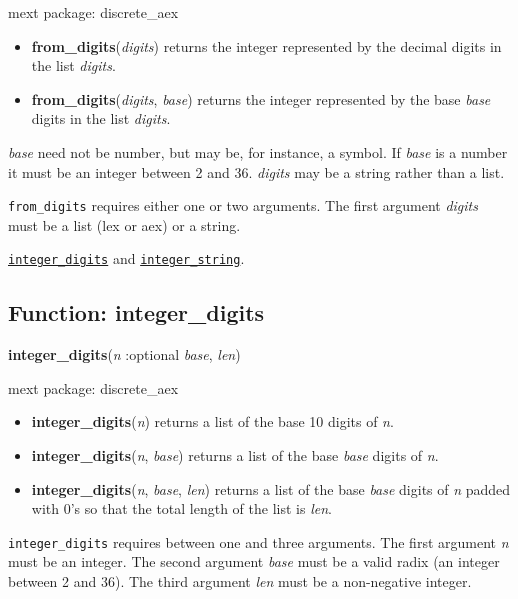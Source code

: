 \documentclass[]{article}
\begin{document}
\noindent mext package: discrete\_aex



\vspace{5 pt}
\begin{itemize}
\item[] {\bf from\_digits}({\it digits})
  returns the integer represented by the decimal digits in the list {\it digits}. 

\item[] {\bf from\_digits}({\it digits}, {\it base})
  returns the integer represented by the base {\it base} digits in the list {\it digits}. 

\end{itemize}
{\it base} need not be number, but may be, for instance, a symbol. If {\it base} is a number it must be an integer between 2 and 36. {\it digits} may be a string rather than a list. 

\vspace{5 pt}

   {\tt from\_digits} requires either one or two arguments.
    The first argument {\it digits} must be a list (lex or aex) or a string.


\vspace{5 pt}


 \hyperlink{integer_digits}{{\tt integer\_digits}} and \hyperlink{integer_string}{{\tt integer\_string}}.

\vspace{5 pt}


\subsection{Function: integer\_digits\label{sec:integer_digits}}
\hypertarget{integer_digits}{}
{\bf integer\_digits}({\it n} :optional {\it base}, {\it len})


\noindent mext package: discrete\_aex



\vspace{5 pt}
\begin{itemize}
\item[] {\bf integer\_digits}({\it n})
  returns a list of the base 10 digits of {\it n}. 

\item[] {\bf integer\_digits}({\it n}, {\it base})
  returns a list of the base {\it base} digits of {\it n}. 

\item[] {\bf integer\_digits}({\it n}, {\it base}, {\it len})
  returns a list of the base {\it base} digits of {\it n} padded with 0's so that the total length of the list is {\it len}. 

\end{itemize}
   {\tt integer\_digits} requires between one and three arguments.
    The first argument {\it n} must be an integer.
    The second argument {\it base} must be a valid radix (an integer between 2 and 36).
    The third argument {\it len} must be a non-negative integer.
\end{document}

